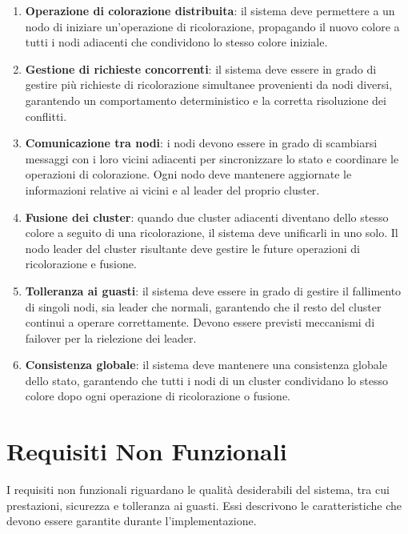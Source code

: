 \documentclass[12pt, a4paper]{report}
\begin{document}
\begin{enumerate}
    \item \textbf{Operazione di colorazione distribuita}: il sistema deve permettere a un nodo di iniziare un'operazione di ricolorazione, propagando il nuovo colore a tutti i nodi adiacenti che condividono lo stesso colore iniziale.

    \item \textbf{Gestione di richieste concorrenti}: il sistema deve essere in grado di gestire pi\`u richieste di ricolorazione simultanee provenienti da nodi diversi, garantendo un comportamento deterministico e la corretta risoluzione dei conflitti.

    \item \textbf{Comunicazione tra nodi}: i nodi devono essere in grado di scambiarsi messaggi con i loro vicini adiacenti per sincronizzare lo stato e coordinare le operazioni di colorazione. Ogni nodo deve mantenere aggiornate le informazioni relative ai vicini e al leader del proprio cluster.

    \item \textbf{Fusione dei cluster}: quando due cluster adiacenti diventano dello stesso colore a seguito di una ricolorazione, il sistema deve unificarli in uno solo. Il nodo leader del cluster risultante deve gestire le future operazioni di ricolorazione e fusione.

    \item \textbf{Tolleranza ai guasti}: il sistema deve essere in grado di gestire il fallimento di singoli nodi, sia leader che normali, garantendo che il resto del cluster continui a operare correttamente. Devono essere previsti meccanismi di failover per la rielezione dei leader.

    \item \textbf{Consistenza globale}: il sistema deve mantenere una consistenza globale dello stato, garantendo che tutti i nodi di un cluster condividano lo stesso colore dopo ogni operazione di ricolorazione o fusione.
\end{enumerate}

\newpage
\section{Requisiti Non Funzionali}

I requisiti non funzionali riguardano le qualit\`a desiderabili del sistema, tra cui prestazioni, sicurezza e tolleranza ai guasti. Essi descrivono le caratteristiche che devono essere garantite durante l'implementazione.
\end{document}
